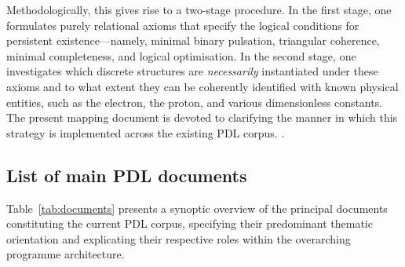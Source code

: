 \documentclass{article}
\begin{document}
Methodologically, this gives rise to a two-stage procedure. In the first stage, one formulates purely relational axioms that specify the logical conditions for persistent existence—namely, minimal binary pulsation, triangular coherence, minimal completeness, and logical optimisation. In the second stage, one investigates which discrete structures are \emph{necessarily} instantiated under these axioms and to what extent they can be coherently identified with known physical entities, such as the electron, the proton, and various dimensionless constants. The present mapping document is devoted to clarifying the manner in which this strategy is implemented across the existing PDL corpus.
\citep{PDL_position}.

\subsection{List of main PDL documents}
\label{subsec:documents}

Table~\ref{tab:documents} presents a synoptic overview of the principal documents constituting the current PDL corpus, specifying their predominant thematic orientation and explicating their respective roles within the overarching programme architecture.

\setlength{\LTpre}{18pt}
\setlength{\LTpost}{0pt}
\end{document}
